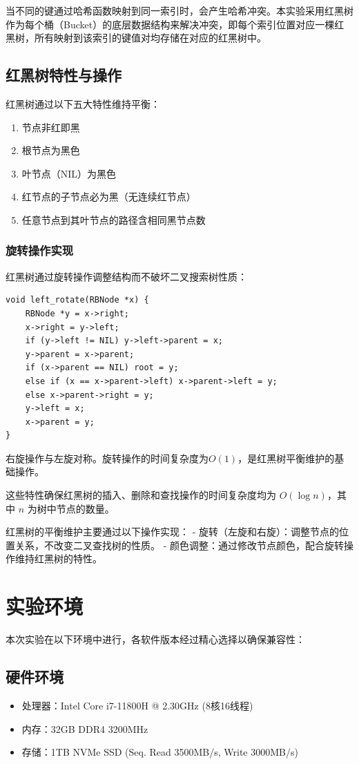 \documentclass[12pt,a4paper]{article}
\begin{document}
当不同的键通过哈希函数映射到同一索引时，会产生哈希冲突。本实验采用红黑树作为每个桶（Bucket）的底层数据结构来解决冲突，即每个索引位置对应一棵红黑树，所有映射到该索引的键值对均存储在对应的红黑树中。

\subsection{红黑树特性与操作}
红黑树通过以下五大特性维持平衡：
\begin{enumerate}
    \item 节点非红即黑
    \item 根节点为黑色
    \item 叶节点（NIL）为黑色
    \item 红节点的子节点必为黑（无连续红节点）
    \item 任意节点到其叶节点的路径含相同黑节点数
\end{enumerate}

\subsubsection{旋转操作实现}
红黑树通过旋转操作调整结构而不破坏二叉搜索树性质：

\begin{lstlisting}[caption=左旋操作实现]
void left_rotate(RBNode *x) {
    RBNode *y = x->right;
    x->right = y->left;
    if (y->left != NIL) y->left->parent = x;
    y->parent = x->parent;
    if (x->parent == NIL) root = y;
    else if (x == x->parent->left) x->parent->left = y;
    else x->parent->right = y;
    y->left = x;
    x->parent = y;
}
\end{lstlisting}

右旋操作与左旋对称。旋转操作的时间复杂度为$O(1)$，是红黑树平衡维护的基础操作。

这些特性确保红黑树的插入、删除和查找操作的时间复杂度均为 \(O(\log n)\)，其中 \(n\) 为树中节点的数量。

红黑树的平衡维护主要通过以下操作实现：
- 旋转（左旋和右旋）：调整节点的位置关系，不改变二叉查找树的性质。
- 颜色调整：通过修改节点颜色，配合旋转操作维持红黑树的特性。

\section{实验环境}
本次实验在以下环境中进行，各软件版本经过精心选择以确保兼容性：

\subsection{硬件环境}
\begin{itemize}
\item 处理器：Intel Core i7-11800H @ 2.30GHz (8核16线程)
\item 内存：32GB DDR4 3200MHz
\item 存储：1TB NVMe SSD (Seq. Read 3500MB/s, Write 3000MB/s)
\end{itemize}
\end{document}
